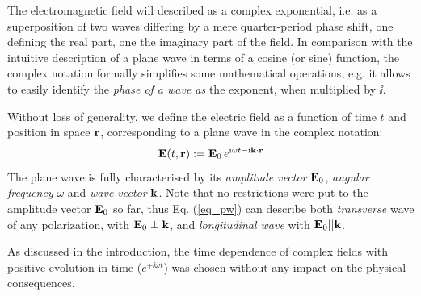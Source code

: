The electromagnetic field will described as a complex exponential, i.e. as a superposition of two waves differing by a mere quarter-period phase shift, one defining the real part, one the imaginary part of the field. In comparison with the intuitive description of a plane wave in terms of a cosine (or sine) function, the complex notation formally simplifies some mathematical operations, e.g. it allows to easily identify the \textit{phase of a wave as} the exponent, when multiplied by $\ii$. 

 

Without loss of generality, we define the electric field as a function of time $t$ and position in space ${\mathbf{r}}$, corresponding to a plane wave in the complex notation:
\begin{equation} \mathbf{E}(t, {\mathbf{r}}) := \mathbf{E}_0\, e^{{\mathrm i}\omega t - {\mathrm i}{\mathbf{k}}\cdot{\mathbf{r}}} \label{eq_pw}\end{equation}
The plane wave is fully characterised by its \textit{amplitude vector} $\mathbf{E}_0$, \textit{angular frequency} $\omega$ and \textit{wave vector} ${\mathbf{k}}$. Note that no restrictions were put to the amplitude vector $\mathbf{E}_0$ so far, thus Eq. (\ref{eq_pw}) can describe both \textit{transverse} wave of any polarization, with $\mathbf{E}_0 \perp {\mathbf{k}}$, and \textit{longitudinal wave} with $\mathbf{E}_0 || {\mathbf{k}}$.

As discussed in the introduction, the time dependence of complex fields with positive evolution in time ($e^{+\ii\omega t}$)  was chosen without any impact on the physical consequences.

